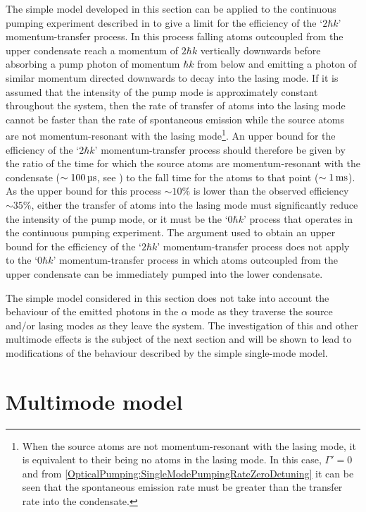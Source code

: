 The simple model developed in this section can be applied to the continuous pumping experiment described in  to give a limit for the efficiency of the `$2 \hbar k$' momentum-transfer process.  In this process falling atoms outcoupled from the upper condensate reach a momentum of $2\hbar k$ vertically downwards before absorbing a pump photon of momentum $\hbar k$ from below and emitting a photon of similar momentum directed downwards to decay into the lasing mode.  If it is assumed that the intensity of the pump mode is approximately constant throughout the system, then the rate of transfer of atoms into the lasing mode cannot be faster than the rate of spontaneous emission while the source atoms are not momentum-resonant with the lasing mode\footnote{When the source atoms are not momentum-resonant with the lasing mode, it is equivalent to their being no atoms in the lasing mode.  In this case, $\Gamma'=0$ and from \eqref{OpticalPumping:SingleModePumpingRateZeroDetuning} it can be seen that the spontaneous emission rate must be greater than the transfer rate into the condensate.}.  An upper bound for the efficiency of the `$2 \hbar k$' momentum-transfer process should therefore be given by the ratio of the time for which the source atoms are momentum-resonant with the condensate ($\sim\unit[100]{\micro s}$, see ) to the fall time for the atoms to that point ($\sim\unit[1]{ms}$).  As the upper bound for this process $\sim 10\%$ is lower than the observed efficiency $\sim 35\%$, either the transfer of atoms into the lasing mode must significantly reduce the intensity of the pump mode, or it must be the `$0 \hbar k$' process that operates in the continuous pumping experiment.  The argument used to obtain an upper bound for the efficiency of the `$2 \hbar k$' momentum-transfer process does not apply to the `$0 \hbar k$' momentum-transfer process in which atoms outcoupled from the upper condensate can be immediately pumped into the lower condensate.

The simple model considered in this section does not take into account the behaviour of the emitted photons in the $\alpha$ mode as they traverse the source and/or lasing modes as they leave the system.  The investigation of this and other multimode effects is the subject of the next section and will be shown to lead to modifications of the behaviour described by the simple single-mode model.

\section{Multimode model}
\label{OpticalPumping:MultimodeModel}

